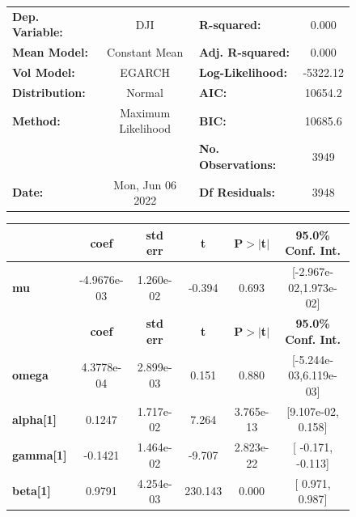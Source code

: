 \documentclass[a4paper, oneside]{discothesis}
\begin{document}
\begin{figure}
\begin{multicols}{2}
{  
\begin{center}
\begin{tabular}{lclc}
\toprule
\textbf{Dep. Variable:} &         DJI        & \textbf{  R-squared:         } &     0.000   \\
\textbf{Mean Model:}    &   Constant Mean    & \textbf{  Adj. R-squared:    } &     0.000   \\
\textbf{Vol Model:}     &       EGARCH       & \textbf{  Log-Likelihood:    } &   -5322.12  \\
\textbf{Distribution:}  &       Normal       & \textbf{  AIC:               } &    10654.2  \\
\textbf{Method:}        & Maximum Likelihood & \textbf{  BIC:               } &    10685.6  \\
\textbf{}               &                    & \textbf{  No. Observations:  } &    3949     \\
\textbf{Date:}          &  Mon, Jun 06 2022  & \textbf{  Df Residuals:      } &    3948     \\
\bottomrule
\end{tabular}
\begin{tabular}{lccccc}
            & \textbf{coef} & \textbf{std err} & \textbf{t} & \textbf{P$> |$t$|$} & \textbf{95.0\% Conf. Int.}  \\
\midrule
\textbf{mu} &  -4.9676e-03  &    1.260e-02     &    -0.394  &          0.693       &   [-2.967e-02,1.973e-02]    \\
                  & \textbf{coef} & \textbf{std err} & \textbf{t} & \textbf{P$> |$t$|$} & \textbf{95.0\% Conf. Int.}  \\
\midrule
\textbf{omega}    &   4.3778e-04  &    2.899e-03     &     0.151  &          0.880       &   [-5.244e-03,6.119e-03]    \\
\textbf{alpha[1]} &       0.1247  &    1.717e-02     &     7.264  &      3.765e-13       &    [9.107e-02,  0.158]      \\
\textbf{gamma[1]} &      -0.1421  &    1.464e-02     &    -9.707  &      2.823e-22       &     [ -0.171, -0.113]       \\
\textbf{beta[1]}  &       0.9791  &    4.254e-03     &   230.143  &        0.000         &     [  0.971,  0.987]       \\
\bottomrule
\end{tabular}
\end{center}

}
\end{multicols}
\end{figure}
\end{document}
